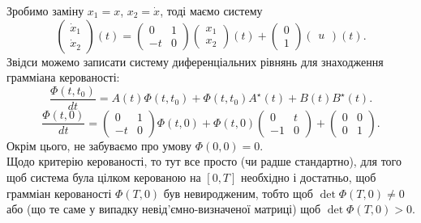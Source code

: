 \begin{solution}
    Зробимо заміну $x_1 = x$, $x_2 = \dot x$, тоді маємо систему \[ \begin{pmatrix} \dot x_1 \\ \dot x_2 \end{pmatrix} (t) = \begin{pmatrix} 0 & 1 \\ -t & 0 \end{pmatrix} \begin{pmatrix} x_1 \\ x_2 \end{pmatrix} (t) + \begin{pmatrix} 0 \\ 1 \end{pmatrix} \begin{pmatrix} u \end{pmatrix} (t). \]
    Звідси можемо записати систему диференціальних рівнянь для знаходження грамміана керованості:
    \[ \dfrac{\Phi(t, t_0)}{dt} = A(t) \Phi(t, t_0) + \Phi(t, t_0) A^\star(t) + B(t) B^\star(t). \]
    \[ \dfrac{\Phi(t, 0)}{dt} = \begin{pmatrix} 0 & 1 \\ -t & 0 \end{pmatrix} \Phi(t, 0) + \Phi(t, 0) \begin{pmatrix} 0 & t \\ -1 & 0 \end{pmatrix} + \begin{pmatrix} 0 & 0 \\ 0 & 1 \end{pmatrix}. \]
    Окрім цього, не забуваємо про умову $\Phi(0, 0) = 0$.\\
    
    Щодо критерію керованості, то тут все просто (чи радше стандартно), для того щоб система була цілком керованою на $[0, T]$ необхідно і достатньо, щоб грамміан керованості $\Phi(T, 0)$ був невиродженим, тобто щоб $\det \Phi(T, 0) \ne 0$ або (що те саме у випадку невід'ємно-визначеної матриці) щоб $\det \Phi(T, 0) > 0$.
\end{solution}

